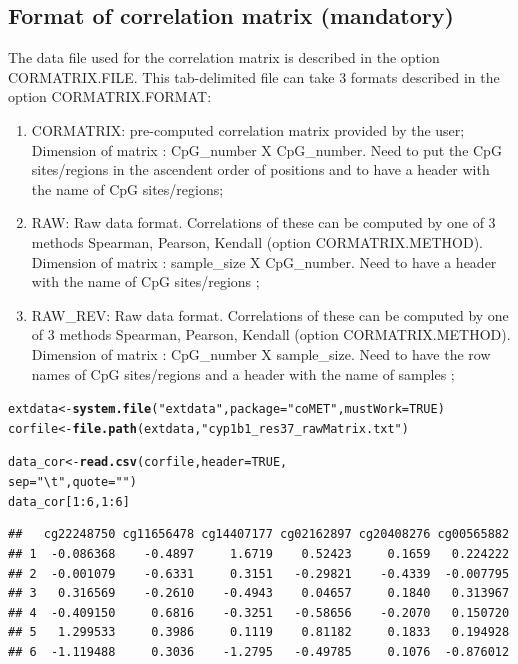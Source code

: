 \documentclass[11pt]{article}\usepackage[]{graphicx}\usepackage[usenames,dvipsnames]{color}
\makeatletter
\newcommand{\hlnum}[1]{\textcolor[rgb]{0.686,0.059,0.569}{#1}}%
\newcommand{\hlstr}[1]{\textcolor[rgb]{0.192,0.494,0.8}{#1}}%
\newcommand{\hlopt}[1]{\textcolor[rgb]{0,0,0}{#1}}%
\newcommand{\hlstd}[1]{\textcolor[rgb]{0.345,0.345,0.345}{#1}}%
\newcommand{\hlkwb}[1]{\textcolor[rgb]{0.69,0.353,0.396}{#1}}%
\newcommand{\hlkwc}[1]{\textcolor[rgb]{0.333,0.667,0.333}{#1}}%
\newcommand{\hlkwd}[1]{\textcolor[rgb]{0.737,0.353,0.396}{\textbf{#1}}}%
\newenvironment{kframe}{%
 \def\at@end@of@kframe{}%
 \ifinner\ifhmode%
  \def\at@end@of@kframe{\end{minipage}}%
  \begin{minipage}{\columnwidth}%
 \fi\fi%
 \def\FrameCommand##1{\hskip\@totalleftmargin \hskip-\fboxsep
 \colorbox{shadecolor}{##1}\hskip-\fboxsep
     \hskip-\linewidth \hskip-\@totalleftmargin \hskip\columnwidth}%
 \MakeFramed {\advance\hsize-\width
   \@totalleftmargin\z@ \linewidth\hsize
   \@setminipage}}%
 {\par\unskip\endMakeFramed%
 \at@end@of@kframe}
\newenvironment{knitrout}{}{} %
\makeatother
\begin{document}
\subsection{Format of correlation matrix (mandatory)}
The data file used for the correlation matrix is described in the option CORMATRIX.FILE. This tab-delimited file can take 3 formats described in the option CORMATRIX.FORMAT:
\begin{enumerate}
\item CORMATRIX: pre-computed correlation matrix provided by the user; Dimension of matrix : CpG\_number X CpG\_number. Need to put the CpG sites/regions in the ascendent order of positions and to have a header with the name of CpG sites/regions;
\item RAW: Raw data format. Correlations of these can be computed by one of 3 methods Spearman, Pearson, Kendall (option CORMATRIX.METHOD). Dimension of matrix :  sample\_size X CpG\_number. Need to have a header with the name of CpG sites/regions ;
\item RAW\_REV: Raw data format. Correlations of these can be computed by one of 3 methods Spearman, Pearson, Kendall (option CORMATRIX.METHOD). Dimension of matrix :  CpG\_number X sample\_size. Need to have the row names of CpG sites/regions and a header with the name of samples ;
\end{enumerate}

\begin{knitrout}
\color{fgcolor}\begin{kframe}
\begin{alltt}
\hlstd{extdata} \hlkwb{<-} \hlkwd{system.file}\hlstd{(}\hlstr{"extdata"}\hlstd{,} \hlkwc{package}\hlstd{=}\hlstr{"coMET"}\hlstd{,}\hlkwc{mustWork}\hlstd{=}\hlnum{TRUE}\hlstd{)}
\hlstd{corfile} \hlkwb{<-} \hlkwd{file.path}\hlstd{(extdata,} \hlstr{"cyp1b1_res37_rawMatrix.txt"}\hlstd{)}

\hlstd{data_cor} \hlkwb{<-}\hlkwd{read.csv}\hlstd{(corfile,} \hlkwc{header} \hlstd{=} \hlnum{TRUE}\hlstd{,}
                    \hlkwc{sep} \hlstd{=} \hlstr{"\textbackslash{}t"}\hlstd{,} \hlkwc{quote} \hlstd{=} \hlstr{""}\hlstd{)}
\hlstd{data_cor[}\hlnum{1}\hlopt{:}\hlnum{6}\hlstd{,}\hlnum{1}\hlopt{:}\hlnum{6}\hlstd{]}
\end{alltt}
\begin{verbatim}
##   cg22248750 cg11656478 cg14407177 cg02162897 cg20408276 cg00565882
## 1  -0.086368    -0.4897     1.6719    0.52423     0.1659   0.224222
## 2  -0.001079    -0.6331     0.3151   -0.29821    -0.4339  -0.007795
## 3   0.316569    -0.2610    -0.4943    0.04657     0.1840   0.313967
## 4  -0.409150     0.6816    -0.3251   -0.58656    -0.2070   0.150720
## 5   1.299533     0.3986     0.1119    0.81182     0.1833   0.194928
## 6  -1.119488     0.3036    -1.2795   -0.49785     0.1076  -0.876012
\end{verbatim}
\end{kframe}
\end{knitrout}
\end{document}
